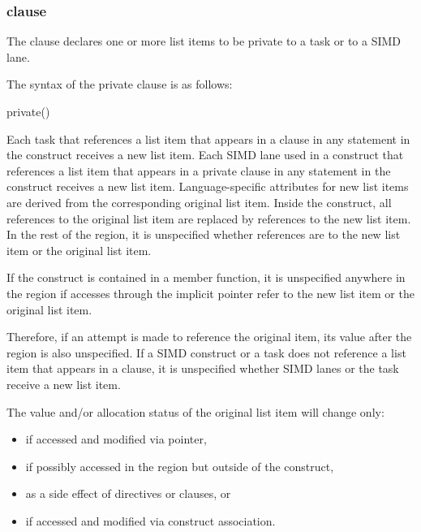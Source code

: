 \subsubsection{ clause}
\label{subsubsec:private clause}
\summary
The  clause declares one or more list items to be private to a task or to a 
SIMD lane.

\syntax
The syntax of the private clause is as follows:

\begin{boxedcode}
private()
\end{boxedcode}

\descr
Each task that references a list item that appears in a  clause in any statement 
in the construct receives a new list item. Each SIMD lane used in a  construct that 
references a list item that appears in a private clause in any statement in the construct 
receives a new list item. Language-specific attributes for new list items are derived from 
the corresponding original list item. Inside the construct, all references to the original 
list item are replaced by references to the new list item. In the rest of the region, it is 
unspecified whether references are to the new list item or the original list item. 

\cppspecificstart
If the construct is contained in a member function, it is unspecified anywhere in the region if accesses through the implicit  pointer refer to the new list item or the original list item.
\cppspecificend

Therefore, if an attempt is made to reference the original item, its value after the region 
is also unspecified. If a SIMD construct or a task does not reference a list item that 
appears in a  clause, it is unspecified whether SIMD lanes or the task receive 
a new list item. 

The value and/or allocation status of the original list item will change only: 

\begin{itemize}
\item if accessed and modified via pointer, 

\item if possibly accessed in the region but outside of the construct, 

\item as a side effect of directives or clauses, or

\fortranspecificstart
\item if accessed and modified via construct association.
\fortranspecificend
\end{itemize}

